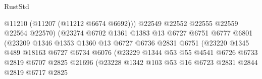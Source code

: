 \begin{lexlean}{RustStd}
\begin{coremodule}
                                        @11210
                                        (@11207 (@11212 @6674 @6692)))
                                      @22549
                                      @22552
                                      @22555
                                      @22559
                                      @22564
                                      @22570)
                                    (@23274
                                      @6702
                                      @1361
                                      @1383
                                      @13
                                      @6727
                                      @6751
                                      @6777
                                      @6801
                                      (@23209
                                        @1346
                                        @1353
                                        @1360
                                        @13
                                        @6727
                                        @6736
                                        @2831
                                        @6751
                                        (@23220
                                          @1345
                                          @489
                                          @18163
                                          @6727
                                          @6734
                                          @6076
                                          (@23229
                                            @1344
                                            @53
                                            @55
                                            @4541
                                            @6726
                                            @6733
                                            @2819
                                            @6707
                                            @2825
                                            @21696
                                            (@23228
                                              @1342
                                              @103
                                              @53
                                              @16
                                              @6723
                                              @2831
                                              @2844
                                              @2819
                                              @6717
                                              @2825

\end{coremodule}
\end{lexlean}
